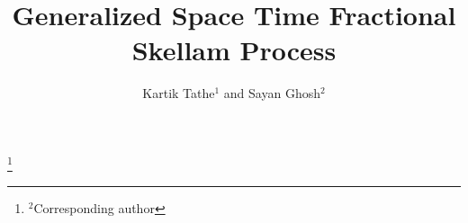\documentclass[11pt,oneside,reqno]{amsart}
\theoremstyle{definition}
\theoremstyle{remarkstyle}
\begin{document}
\color{black}       %
%
\title{Generalized Space Time Fractional Skellam Process}



\author{Kartik Tathe$^1$ and Sayan Ghosh$^2$}
\address{Department of Mathematics, Birla Institute of Technology and Science, Pilani, Hyderabad Campus, Jawahar Nagar, Kapra Mandal, Medchal District, Telangana 500078, India.}
\thanks{$^2$Corresponding author}





\end{document}
